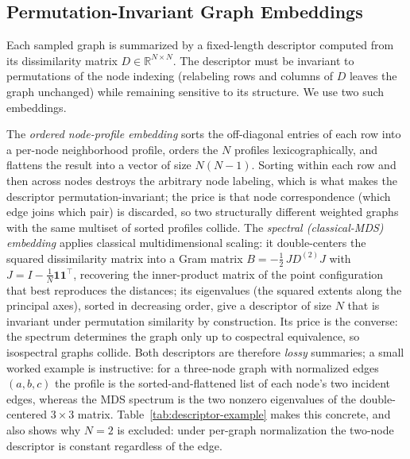 \documentclass[11pt,letterpaper]{article}
\begin{document}
\subsection{Permutation-Invariant Graph Embeddings}
\label{sec:embeddings}

Each sampled graph is summarized by a fixed-length descriptor computed from its
dissimilarity matrix $D \in \mathbb{R}^{N \times N}$. The descriptor must be invariant
to permutations of the node indexing (relabeling rows and columns of $D$ leaves the
graph unchanged) while remaining sensitive to its structure. We use two such
embeddings.

The \emph{ordered node-profile embedding} sorts the off-diagonal entries of each row
into a per-node neighborhood profile, orders the $N$ profiles lexicographically, and
flattens the result into a vector of size $N(N-1)$. Sorting within each row and then
across nodes destroys the arbitrary node labeling, which is what makes the descriptor
permutation-invariant; the price is that node correspondence (which edge joins which
pair) is discarded, so two structurally different weighted graphs with the same
multiset of sorted profiles collide. The \emph{spectral (classical-MDS) embedding}
applies classical multidimensional scaling: it double-centers the squared
dissimilarity matrix into a Gram matrix
$B = -\tfrac{1}{2}\, J D^{(2)} J$ with $J = I - \tfrac{1}{N}\mathbf{1}\mathbf{1}^\top$,
recovering the inner-product matrix of the point configuration that best reproduces
the distances; its eigenvalues (the squared extents along the principal axes),
sorted in decreasing order, give a descriptor of size $N$ that is invariant under
permutation similarity by construction. Its price is the converse: the spectrum
determines the graph only up to cospectral equivalence, so isospectral graphs
collide. Both descriptors are therefore \emph{lossy} summaries; a small worked
example is instructive: for a three-node graph with normalized edges $(a, b, c)$ the
profile is the sorted-and-flattened list of each node's two incident edges, whereas
the MDS spectrum is the two nonzero eigenvalues of the double-centered
$3 \times 3$ matrix. Table~\ref{tab:descriptor-example} makes this concrete, and also
shows why $N=2$ is excluded: under per-graph normalization the two-node descriptor is
constant regardless of the edge.
\end{document}

